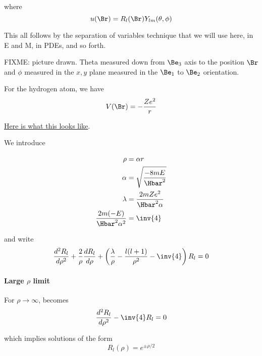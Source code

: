 where
\begin{equation}\label{eqn:PHY356FLecture10:80}
u(\Br) = R_l(\Br) Y_{lm}(\theta, \phi)
\end{equation}

This all follows by the separation of variables technique that we will use here, in E and M, in PDEs, and so forth.

FIXME: picture drawn.  Theta measured down from \(\Be_3\) axis to the position \(\Br\) and \(\phi\) measured in the \(x,y\) plane measured in the \(\Be_1\) to \(\Be_2\) orientation.

For the hydrogen atom, we have
%
\begin{equation}\label{eqn:PHY356FLecture10:90}
V(\Br) = - \frac{Z e^2}{r}
\end{equation}

\href{http://www.wolframalpha.com/input/?i=graph+-1/r}{Here is what this looks like}.

We introduce

\begin{align}\label{eqn:PHY356FLecture10:100}
\rho &= \alpha r \\
\alpha &= \sqrt{\frac{-8 m E}{\Hbar^2}} \\
\lambda &= \frac{2 m Z e^2}{\Hbar^2 \alpha} \\
\frac{2 m (- E) }{\Hbar^2 \alpha^2 } &= \inv{4}
\end{align}

and write
\begin{equation}\label{eqn:PHY356FLecture10:110}
\frac{d^2 R_l}{d\rho^2} + \frac{2}{\rho} \frac{d R_l}{d\rho} + \left( \frac{\lambda}{\rho} - \frac{l(l+1)}{\rho^2} - \inv{4} \right) R_l = 0
\end{equation}

\paragraph{Large \(\rho\) limit}

For \(\rho \rightarrow \infty\),  becomes
\begin{equation}\label{eqn:PHY356FLecture10:120}
\frac{d^2 R_l}{d\rho^2} - \inv{4} R_l = 0
\end{equation}

which implies solutions of the form
\begin{equation}\label{eqn:PHY356FLecture10:130}
R_l(\rho) = e^{\pm \rho/2}
\end{equation}

